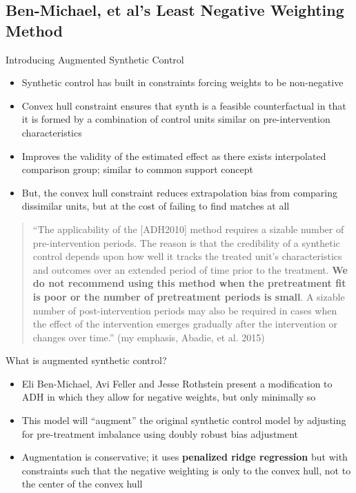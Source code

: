 \documentclass{beamer}
\begin{document}
\subsection{Ben-Michael, et al's Least Negative Weighting Method}

\begin{frame}{Introducing Augmented Synthetic Control}
\begin{itemize}
\item Synthetic control has built in constraints forcing weights to be non-negative
\item Convex hull constraint ensures that synth is a feasible counterfactual in that it is formed by a combination of control units similar on pre-intervention characteristics
\item Improves the validity of the estimated effect as there exists interpolated comparison group; similar to common support concept
\item But, the convex hull constraint reduces extrapolation bias from comparing dissimilar units, but at the cost of failing to find matches at all
\end{itemize}

\end{frame}


\begin{frame}

\begin{quote}
``The applicability of the [ADH2010] method requires a sizable number of pre-intervention periods. The reason is that the credibility of a synthetic control depends upon how well it tracks the treated unit’s characteristics and outcomes over an extended period of time prior to the treatment. \textbf{We do not recommend using this method when the pretreatment fit is poor or the number of pretreatment periods is small}. A sizable number of post-intervention periods may also be required in cases when the effect of the intervention emerges gradually after the intervention or changes over time.'' (my emphasis, Abadie, et al. 2015)
\end{quote}

\end{frame}

\begin{frame}{What is augmented synthetic control?}

\begin{itemize}
\item Eli Ben-Michael, Avi Feller and Jesse Rothstein present a modification to ADH in which they allow for negative weights, but only minimally so
\item This model will ``augment'' the original synthetic control model by adjusting for pre-treatment imbalance using doubly robust bias adjustment 
\item Augmentation is conservative; it uses \textbf{penalized ridge regression} but with constraints such that the negative weighting is only to the convex hull, not to the center of the convex hull
\end{itemize}

\end{frame}
\end{document}
